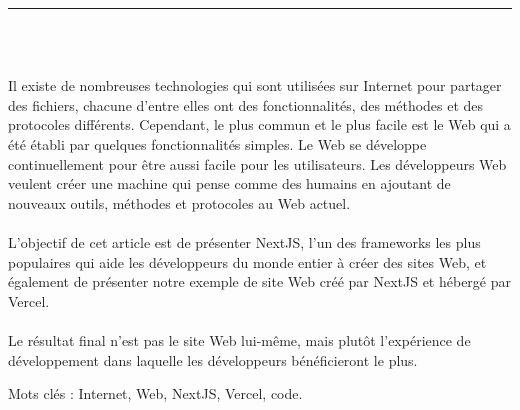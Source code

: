 \documentclass[12pt]{report}
\newenvironment{changemargin}[2]{%
\begin{list}{}{%
\setlength{\topsep}{0pt}%
\setlength{\leftmargin}{#1}%
\setlength{\rightmargin}{#2}%
\setlength{\listparindent}{\parindent}%
\setlength{\itemindent}{\parindent}%
\setlength{\parsep}{\parskip}%
}%
\item[]}{\end{list}}
\begin{document}
\begin{center}
    {\color{Black} \rule{3in}{1.4mm} }\\
    \vspace{0.1in}
    \scshape{\fontsize{34}{46}{\bfseries{\color{Black}{Résumé}}}}
    \\
    \vspace{0.6in}
\end{center}
\begin{changemargin}{0.9cm}{0.9cm}
\hspace*{0.16in}
Il existe de nombreuses technologies qui sont utilisées sur Internet pour partager des fichiers, chacune d’entre elles ont des fonctionnalités, des méthodes et des protocoles différents. Cependant, le plus commun et le plus facile est le Web qui a été établi par quelques fonctionnalités simples. Le Web se développe continuellement pour être aussi facile pour les utilisateurs. Les développeurs Web veulent créer une machine qui pense comme des humains en ajoutant de nouveaux outils, méthodes et protocoles au Web actuel.
\\\\
\hspace*{0.16in}
L’objectif de cet article est de présenter NextJS, l’un des frameworks les plus populaires qui aide les développeurs du monde entier à créer des sites Web, et également de présenter notre exemple de site Web créé par NextJS et hébergé par Vercel.
\\\\
\hspace*{0.16in}
Le résultat final n’est pas le site Web lui-même, mais plutôt l’expérience de développement dans laquelle les développeurs bénéficieront le plus.\end{changemargin}

\vspace{1in}

\begin{changemargin}{0.9cm}{0.9cm}
Mots clés : Internet, Web, NextJS, Vercel, code.
\end{changemargin}

\newpage

\vspace*{0.2in}

\thispagestyle{empty}
\end{document}
